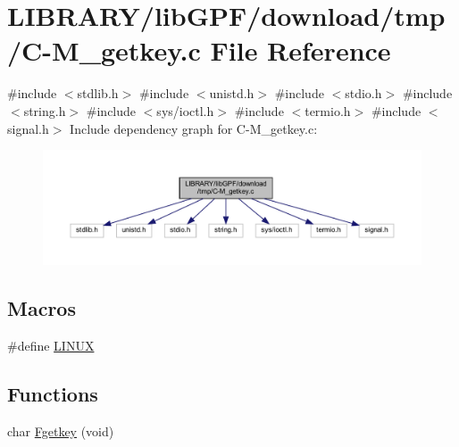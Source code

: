 \hypertarget{C-M__getkey_8c}{}\section{L\+I\+B\+R\+A\+R\+Y/lib\+G\+P\+F/download/tmp/\+C-\/\+M\+\_\+getkey.c File Reference}
\label{C-M__getkey_8c}
{\ttfamily \#include $<$stdlib.\+h$>$}\newline
{\ttfamily \#include $<$unistd.\+h$>$}\newline
{\ttfamily \#include $<$stdio.\+h$>$}\newline
{\ttfamily \#include $<$string.\+h$>$}\newline
{\ttfamily \#include $<$sys/ioctl.\+h$>$}\newline
{\ttfamily \#include $<$termio.\+h$>$}\newline
{\ttfamily \#include $<$signal.\+h$>$}\newline
Include dependency graph for C-\/\+M\+\_\+getkey.c\+:
\nopagebreak
\begin{figure}[H]
\begin{center}
\leavevmode
\includegraphics[width=350pt]{C-M__getkey_8c__incl}
\end{center}
\end{figure}
\subsection*{Macros}
\begin{DoxyCompactItemize}
\item 
\#define \hyperlink{C-M__getkey_8c_a157a956e14c5c44b3f73ef23a4776f64}{L\+I\+N\+UX}
\end{DoxyCompactItemize}
\subsection*{Functions}
\begin{DoxyCompactItemize}
\item 
char \hyperlink{C-M__getkey_8c_a257d1f3a5480d15d83e0bf1d43647afc}{Fgetkey} (void)
\end{DoxyCompactItemize}


